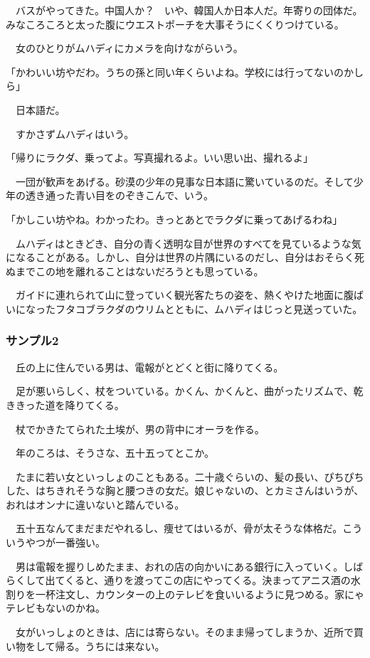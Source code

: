 \documentclass[11pt,a4paper]{ltjsarticle}
\begin{document}
　バスがやってきた。中国人か？　いや、韓国人か日本人だ。年寄りの団体だ。みなころころと太った腹にウエストポーチを大事そうにくくりつけている。

　女のひとりがムハディにカメラを向けながらいう。

「かわいい坊やだわ。うちの孫と同い年くらいよね。学校には行ってないのかしら」

　日本語だ。

　すかさずムハディはいう。

「帰りにラクダ、乗ってよ。写真撮れるよ。いい思い出、撮れるよ」

　一団が歓声をあげる。砂漠の少年の見事な日本語に驚いているのだ。そして少年の透き通った青い目をのぞきこんで、いう。

「かしこい坊やね。わかったわ。きっとあとでラクダに乗ってあげるわね」

　ムハディはときどき、自分の青く透明な目が世界のすべてを見ているような気になることがある。しかし、自分は世界の片隅にいるのだし、自分はおそらく死ぬまでこの地を離れることはないだろうとも思っている。

　ガイドに連れられて山に登っていく観光客たちの姿を、熱くやけた地面に腹ばいになったフタコブラクダのウリムとともに、ムハディはじっと見送っていた。

\subsubsection{サンプル2}

　丘の上に住んでいる男は、電報がとどくと街に降りてくる。

　足が悪いらしく、杖をついている。かくん、かくんと、曲がったリズムで、乾ききった道を降りてくる。

　杖でかきたてられた土埃が、男の背中にオーラを作る。

　年のころは、そうさな、五十五ってとこか。

　たまに若い女といっしょのこともある。二十歳ぐらいの、髪の長い、ぴちぴちした、はちきれそうな胸と腰つきの女だ。娘じゃないの、とカミさんはいうが、おれはオンナに違いないと踏んでいる。

　五十五なんてまだまだやれるし、痩せてはいるが、骨が太そうな体格だ。こういうやつが一番強い。

　男は電報を握りしめたまま、おれの店の向かいにある銀行に入っていく。しばらくして出てくると、通りを渡ってこの店にやってくる。決まってアニス酒の水割りを一杯注文し、カウンターの上のテレビを食いいるように見つめる。家にゃテレビもないのかね。

　女がいっしょのときは、店には寄らない。そのまま帰ってしまうか、近所で買い物をして帰る。うちには来ない。
\end{document}
